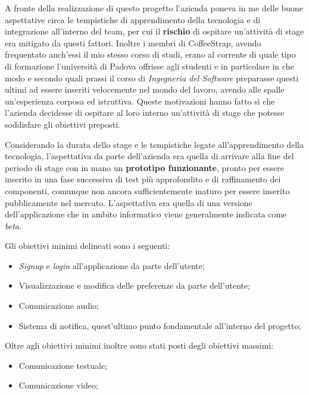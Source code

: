 A fronte della realizzazione di questo progetto l'azienda poneva in me delle buone aspettative circa le tempistiche di apprendimento della tecnologia e di integrazione all'interno del team, per cui il \textbf{rischio} di ospitare un'attività di stage era mitigato da questi fattori. Inoltre i membri di CoffeeStrap, avendo frequentato anch'essi il mio stesso corso di studi, erano al corrente di quale tipo di formazione l'università di Padova offrisse agli studenti e in particolare in che modo e secondo quali prassi il corso di \textit{Ingegneria del Software} preparasse questi ultimi ad essere inseriti velocemente nel mondo del lavoro, avendo alle spalle un'esperienza corposa ed istruttiva. Queste motivazioni hanno fatto sì che l'azienda decidesse di ospitare al loro interno un'attività di stage che potesse soddisfare gli obiettivi preposti. 

Considerando la durata dello stage e le tempistiche legate all'apprendimento della tecnologia, l'aspettativa da parte dell'azienda era quella di arrivare alla fine del periodo di stage con in mano un \textbf{prototipo funzionante}, pronto per essere inserito in una fase successiva di test più approfondito e di raffinamento dei componenti, comunque non ancora sufficientemente maturo per essere inserito pubblicamente nel mercato. L'aspettativa era quella di una versione dell'applicazione che in ambito informatico viene generalmente indicata come \textit{beta}.

Gli obiettivi minimi delineati sono i seguenti:

\begin{itemize}

\item \textit{Signup} e \textit{login} all'applicazione da parte dell'utente;
\item Visualizzazione e modifica delle preferenze da parte dell'utente;
\item Comunicazione audio;
\item Sistema di notifica, quest'ultimo punto fondamentale all'interno del progetto;

\end{itemize}

Oltre agli obiettivi minimi inoltre sono stati posti degli obiettivi massimi:

\begin{itemize}

\item Comunicazione testuale;
\item Comunicazione video;

\end{itemize}

